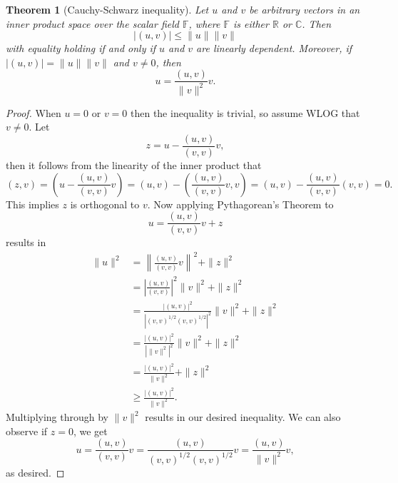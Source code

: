 \documentclass[11pt]{article}
\newtheorem{theorem}{Theorem}
\theoremstyle{definition}
\begin{document}
\begin{theorem}[Cauchy-Schwarz inequality]
	Let $u$ and $v$ be arbitrary vectors in an inner product space over the scalar field $\mathbb{F}$,
	where $\mathbb{F}$ is either $\mathbb{R}$ or $\mathbb{C}$. Then
	\begin{equation*}
		|(u,v)| \leq \|u\|\|v\|
	\end{equation*}
	with equality holding if and only if $u$ and $v$ are linearly dependent.
	Moreover, if $|(u,v)| = \|u\|\|v\|$ and $v\not=0$, then
	\begin{equation*}
		u = \frac{(u,v)}{\|v\|^2}v.
	\end{equation*}
\end{theorem}
\begin{proof}
	When $u=0$ or $v=0$ then the inequality is trivial, so assume WLOG that $v\not=0$.
	Let
	\begin{equation*}
		z = u - \frac{(u,v)}{(v,v)}v,
	\end{equation*}
	then it follows from the linearity of the inner product that
	\begin{equation*}
		(z,v) = \left(u - \frac{(u,v)}{(v,v)}v\right) = (u,v) - \left(\frac{(u,v)}{(v,v)}v,v\right) = (u,v) - \frac{(u,v)}{(v,v)}(v,v) = 0.
	\end{equation*}
	This implies $z$ is orthogonal to $v$. Now applying Pythagorean's Theorem to
	\begin{equation*}
		u = \frac{(u,v)}{(v,v)}v + z
	\end{equation*}
	results in
	\begin{equation*}
		\begin{aligned}
			\|u\|^2 &= \left\|\frac{(u,v)}{(v,v)}v\right\|^2 + \|z\|^2 \\
				&= \left|\frac{(u,v)}{(v,v)}\right|^2 \|v\|^2 + \|z\|^2 \\
				&= \frac{|(u,v)|^2}{|(v,v)^{1/2}(v,v)^{1/2}|^2}\|v\|^2 + \|z\|^2 \\
				&= \frac{|(u,v)|^2}{|\|v\|^2|^2}\|v\|^2 + \|z\|^2 \\
				&= \frac{|(u,v)|^2}{\|v\|^2} + \|z\|^2 \\
				&\geq \frac{|(u,v)|^2}{\|v\|^2}.
		\end{aligned}
	\end{equation*}
	Multiplying through by $\|v\|^2$ results in our desired inequality. We can also observe if $z=0$, we get
	\begin{equation*}
		u = \frac{(u,v)}{(v,v)}v = \frac{(u,v)}{(v,v)^{1/2}(v,v)^{1/2}}v = \frac{(u,v)}{\|v\|^2}v,
	\end{equation*}
	as desired.
\end{proof}
\end{document}
